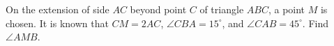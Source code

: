 On the extension of side $AC$ beyond point $C$ of triangle $ABC$, a point $M$ is chosen. It is known that $CM=2AC$, $\angle CBA=15^{\circ}$, and $\angle CAB=45^{\circ}$. Find $\angle AMB$.
